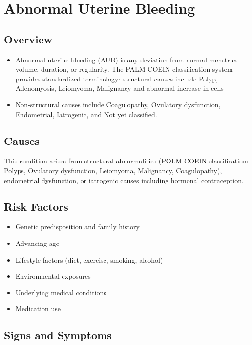 \chapter{Abnormal Uterine Bleeding}
\label{sec:Abnormal Uterine Bleeding}

\section{Overview}


\begin{itemize}[noitemsep]
  \item Abnormal uterine bleeding (AUB) is any deviation from normal menstrual volume, duration, or regularity. The PALM-COEIN classification system provides standardized terminology: structural causes include Polyp, Adenomyosis, Leiomyoma, Malignancy and abnormal increase in cells
  \item Non-structural causes include Coagulopathy, Ovulatory dysfunction, Endometrial, Iatrogenic, and Not yet classified.
\end{itemize}
\section{Causes}
This condition arises from structural abnormalities (POLM-COEIN classification: Polyps, Ovulatory dysfunction, Leiomyoma, Malignancy, Coagulopathy), endometrial dysfunction, or iatrogenic causes including hormonal contraception.
\section{Risk Factors}

\begin{itemize}[noitemsep]
  \item Genetic predisposition and family history
  \item Advancing age
  \item Lifestyle factors (diet, exercise, smoking, alcohol)
  \item Environmental exposures
  \item Underlying medical conditions
  \item Medication use
\end{itemize}
\section{Signs and Symptoms}


